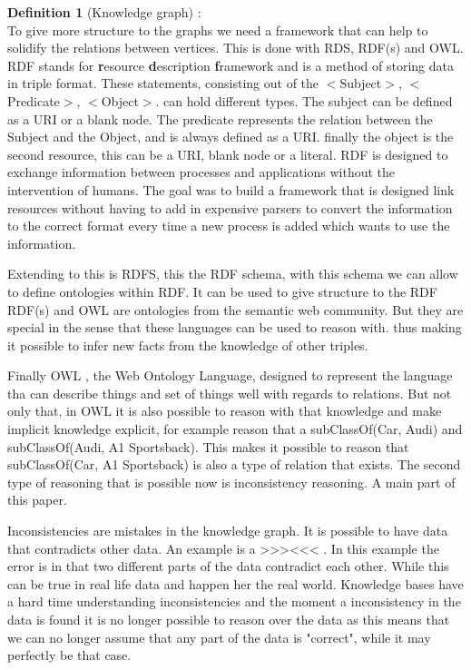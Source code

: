 \documentclass{article}
\begin{document}
\textbf{Definition 1} (Knowledge graph) :\\

To give more structure to the graphs we need a framework that can help to solidify the relations between vertices. This is done with RDS, RDF(s) and OWL.\\
RDF \cite{rdfPrimer:2014} stands for \textbf{r}esource \textbf{d}escription \textbf{f}ramework and is a method of storing data in triple format. These statements, consisting out of the $<$Subject$>$, $<$Predicate$>$, $<$Object$>$. can hold different types. The subject can be defined as a URI or a blank node. The predicate represents the relation between the Subject and the Object, and is always defined as a URI. finally the object is the second resource, this can be a URI, blank node or a literal.
RDF is designed to exchange information between processes and applications without the intervention of humans. The goal was to build a framework that is designed link resources without having to add in expensive parsers to convert the information to the correct format every time a new process is added which wants to use the information.

Extending to this is RDFS, this the RDF schema, with this schema we can allow to define ontologies within RDF. It can be used to give structure to the RDF
RDF(s) and OWL are ontologies from the semantic web community. But they are special in the sense that these languages can be used to reason with. thus making it possible to infer new facts from the knowledge of other triples.

Finally OWL \cite{OWLPrimer:2012}, the Web Ontology Language, designed to represent the language tha can describe things and set of things well with regards to relations. But not only that, in OWL it is also possible to reason with that knowledge and make implicit knowledge explicit, for example reason that a subClassOf(Car, Audi) and subClassOf(Audi, A1 Sportsback). This makes it possible to reason that subClassOf(Car, A1 Sportsback) is also a type of relation that exists. The second type of reasoning that is possible now is inconsistency reasoning. A main part of this paper.

Inconsistencies are mistakes in the knowledge graph. It is possible to have data that contradicts other data. An example is a >>><<< . In this example the error is in that two different parts of the data contradict each other. While this can be true in real life data and happen her the real world. Knowledge bases have a hard time understanding inconsistencies and the moment a inconsistency in the data is found it is no longer possible to reason over the data as this means that we can no longer assume that any part of the data is "correct", while it may perfectly be that case.\\
\end{document}

